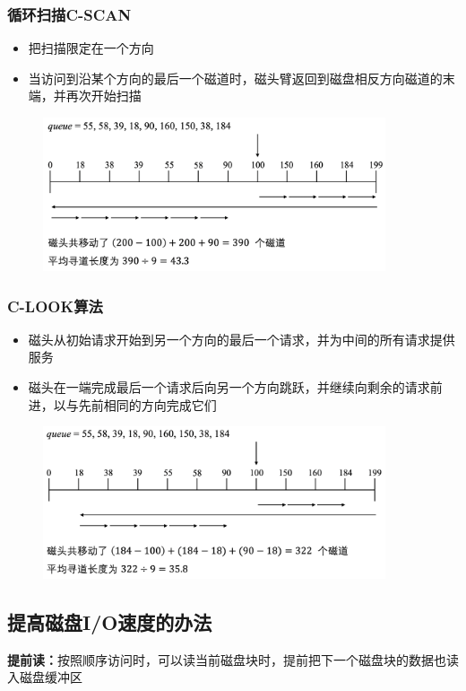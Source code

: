 \documentclass[cs4size,a4paper,10pt]{ctexart}
\begin{document}
	\subsubsection{循环扫描C-SCAN}
	\begin{itemize}
		\item 把扫描限定在一个方向
		\item 当访问到沿某个方向的最后一个磁道时，磁头臂返回到磁盘相反方向磁道的末端，并再次开始扫描
	\end{itemize}
	\begin{figure}[H]
		\centering
		\includegraphics[width=0.9\textwidth]{img/C-SCAN}
	\end{figure}

	\subsubsection{C-LOOK算法}
	\begin{itemize}
		\item 磁头从初始请求开始到另一个方向的最后一个请求，并为中间的所有请求提供服务
		\item 磁头在一端完成最后一个请求后向另一个方向跳跃，并继续向剩余的请求前进，以与先前相同的方向完成它们
	\end{itemize}
	\begin{figure}[H]
		\centering
		\includegraphics[width=0.9\textwidth]{img/C-LOOK}
	\end{figure}

	\subsection{提高磁盘I/O速度的办法}
	\textbf{提前读：}按照顺序访问时，可以读当前磁盘块时，提前把下一个磁盘块的数据也读入磁盘缓冲区
\end{document}
